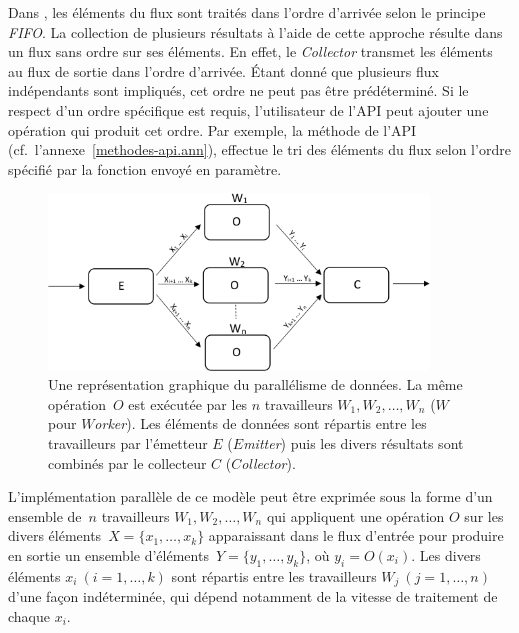 Dans , les \'el\'ements du flux sont trait\'es dans l'ordre d'arriv\'ee selon le principe \emph{FIFO}. La collection de plusieurs r\'esultats \`a l'aide de cette approche r\'esulte dans un flux sans ordre sur ses \'el\'ements. En effet, le \emph{Collector} transmet les \'el\'ements au flux de sortie dans l'ordre d'arriv\'ee. \'Etant donn\'e que plusieurs flux ind\'ependants sont impliqu\'es, cet ordre ne peut pas \^etre pr\'ed\'etermin\'e. Si le respect d'un  ordre sp\'ecifique est requis, l'utilisateur de l'API peut ajouter une op\'eration qui produit cet ordre. Par exemple, la m\'ethode  de l'API (cf.~l'annexe~\ref{methodes-api.ann}), effectue le tri des \'el\'ements du flux selon l'ordre sp\'ecifi\'e par la fonction  envoy\'e en param\`etre.

\begin{figure}

\centering
     \includegraphics[width=0.9\textwidth]{Figures/DataParallelisme.png}
      \caption[Une repr\'esentation graphique du parall\'elisme de donn\'ees en \ppff.]{Une repr\'esentation graphique du parall\'elisme de donn\'ees. La m\^eme op\'eration~$O$ est ex\'ecut\'ee par les $n$ travailleurs $W_1, W_2,\ldots, W_n$ ($W$ pour \emph{$W$orker}). Les \'el\'ements de donn\'ees sont r\'epartis entre les travailleurs par l'\'emetteur $E$ ($E$\emph{mitter}) puis les divers r\'esultats sont combin\'es par le collecteur $C$ ($C$\emph{ollector}).}
       \label{DataParallelisme.fig}
\end{figure}


L'impl\'ementation parall\`ele de ce mod\`ele peut \^etre
exprim\'ee sous la forme d'un ensemble de~$n$ travailleurs $W_1, W_2,\ldots, W_n$ qui
appliquent une op\'eration $O$ sur les divers \'el\'ements~$X = \{x_1, \ldots, x_k\}$ apparaissant dans
le flux d'entr\'ee pour produire en sortie un ensemble d'\'el\'ements~$Y = \{y_1, \ldots, y_k\}$, o\`u $y_i = O(x_i)$.
%
Les divers \'el\'ements $x_i~(i=1, \ldots, k)$ sont r\'epartis entre
les travailleurs $W_j~(j=1, \ldots, n)$ d'une fa\c{c}on
ind\'etermin\'ee, qui d\'epend notamment de la vitesse de traitement
de chaque $x_i$.
%

